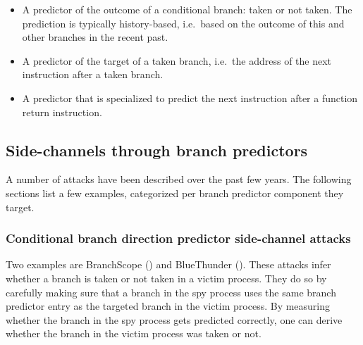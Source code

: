 \documentclass[
  a4paper,
]{report}
\providecommand{\tightlist}{%
  \setlength{\itemsep}{0pt}\setlength{\parskip}{0pt}}
\begin{document}
\begin{itemize}
\tightlist
\item
  A predictor of the outcome of a
  \label{__index_entry_145}{conditional
  branch}:
  \label{__index_entry_146}{taken} or
  not taken. The prediction is typically
  \label{__index_entry_147}{history-based},
  i.e.~based on the outcome of this and other branches in the recent
  past.
\item
  A predictor of the \label{__index_entry_148}{target of
  a taken branch}, i.e.~the address of
  the next instruction after a taken branch.
\item
  A predictor that is specialized to
  \label{__index_entry_149}{predict the next instruction
  after a function return instruction}.
\end{itemize}

\subsection{Side-channels through branch
predictors}\label{side-channels-through-branch-predictors}

A number of attacks have been described over the past few years. The
following sections list a few examples, categorized per branch predictor
component they target.

\subsubsection{Conditional branch direction predictor side-channel
attacks}\label{conditional-branch-direction-predictor-side-channel-attacks}

\label{__index_entry_150}{}

Two examples are
\label{__index_entry_151}{BranchScope}
() and
\label{__index_entry_152}{BlueThunder}
(). These attacks infer whether a
branch is taken or not taken in a victim process. They do so by
carefully making sure that a branch in the spy process uses the same
branch predictor entry as the targeted branch in the victim process. By
measuring whether the branch in the spy process gets predicted
correctly, one can derive whether the branch in the victim process was
taken or not.
\end{document}
